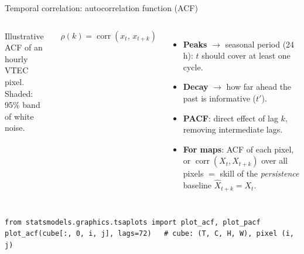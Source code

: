 \documentclass{beamer}
\begin{document}
\begin{frame}[fragile]{Temporal correlation: autocorrelation function (ACF)}
    \begin{columns}[c]
        \centering

        {\tiny Illustrative ACF of an hourly VTEC pixel.\\ Shaded: 95\% band of white noise.\par}

        \scriptsize
        \[
            \rho(k) = \operatorname{corr}(x_t,\, x_{t+k})
        \]
        \begin{itemize}
            \item \textbf{Peaks} $\rightarrow$ seasonal period (24 h): $t$ should cover at least one cycle.
            \item \textbf{Decay} $\rightarrow$ how far ahead the past is informative ($t'$).
            \item \textbf{PACF}: direct effect of lag $k$, removing intermediate lags.
            \item \textbf{For maps}: ACF of each pixel, or $\operatorname{corr}(X_t, X_{t+k})$ over all pixels $=$ skill of the \emph{persistence} baseline $\hat{X}_{t+k} = X_t$.
        \end{itemize}
    \end{columns}

    \vspace{0.1cm}
    \begin{verbatim}
from statsmodels.graphics.tsaplots import plot_acf, plot_pacf
plot_acf(cube[:, 0, i, j], lags=72)   # cube: (T, C, H, W), pixel (i, j)
    \end{verbatim}
\end{frame}
\end{document}
